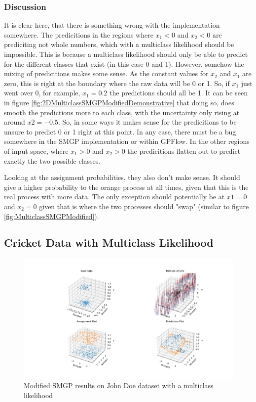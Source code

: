 \documentclass[12pt,a4paper]{report}
\theoremstyle{definition}
\begin{document}
\subsubsection{Discussion}

It is clear here, that there is something wrong with the implementation somewhere.
The predicitions in the regions where $x_{1} < 0$ and $x_{2} < 0$ are prediciting not whole numbers, which with a multiclass likelihood should be impossible.
This is because a multiclass likelihood should only be able to predict for the different classes that exist (in this case 0 and 1).
However, somehow the mixing of predicitions makes some sense.
As the constant values for $x_{2}$ and $x_{1}$ are zero, this is right at the boundary where the raw data will be 0 or 1. 
So, if $x_{1}$ just went over 0, for example, $x_{1} = 0.2$ the predictions should all be 1.
It can be seen in figure \ref{fig:2DMulticlassSMGPModifiedDemonstrative} that doing so, does smooth the predictions more to each class, with the uncertainty only rising at around $x{2} = -0.5$.
So, in some ways it makes sense for the predicitions to be unsure to predict 0 or 1 right at this point.
In any case, there must be a bug somewhere in the SMGP implementation or within GPFlow.
In the other regions of input space, where $x_{1} > 0$ and $x_{2} > 0$ the predicitions flatten out to predict exactly the two possible classes.

Looking at the assignment probabilities, they also don't make sense.
It should give a higher probability to the orange process at all times, given that this is the real process with more data.
The only exception should potentially be at $x{1} = 0$ and $x_{2} = 0$ given that is where the two processes should "swap" (similar to figure \ref{fig:MulticlassSMGPModified}).

\subsection{Cricket Data with Multiclass Likelihood}

\begin{figure}[H]
    \centering
    \includegraphics[width=\linewidth]{demo_JohnDoe_RightArmSeam_stumpsX_stumpsY_multi_class_1.png}
    \caption{Modified SMGP results on John Doe dataset with a multiclass likelihood}
    \label{fig:CricketMulticlassSMGPModified1}
\end{figure}
\end{document}
